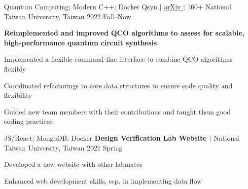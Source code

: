 

\begin{cventries}
    \cventry
        {Quantum Computing; Modern C++; Docker} %
        {Qsyn 
        $|$ 
        \href{https://arxiv.org/abs/2405.07197}{arXiv \faLink} 
        $|$ 
        \href{https://github.com/DVLab-NTU/qsyn}{\faGithub} 160+ \raisebox{0.1em}{\textbf{$\star$}}} %
        {National Taiwan University, Taiwan} %
        {2022 Fall--Now} %
        {
          \begin{cvitems} %
            \item \textcolor{awesome}{\textbf{Reimplemented and improved QCO algorithms to assess for scalable, high-performance quantum circuit synthesis}}
            \item Implemented a flexible command-line interface to combine QCO algorithms flexibly
            \item Coordinated refactorings to core data structures to ensure code quality and flexibility
            \item Guided new team members with their contributions and taught them good coding practices
          \end{cvitems}
        }

    \cventry
        {JS/React; MongoDB; Docker} %
        {\textbf{Design Verification Lab Website $|$ \href{https://dvlab.ee.ntu.edu.tw/}{\faLink}}} %
        {National Taiwan University, Taiwan} %
        {2021 Spring} %
        {
          \begin{cvitems} %
            \item Developed a new website with other labmates
            \item Enhanced web development skills, esp. in implementing data flow
          \end{cvitems}
        }


\end{cventries}
